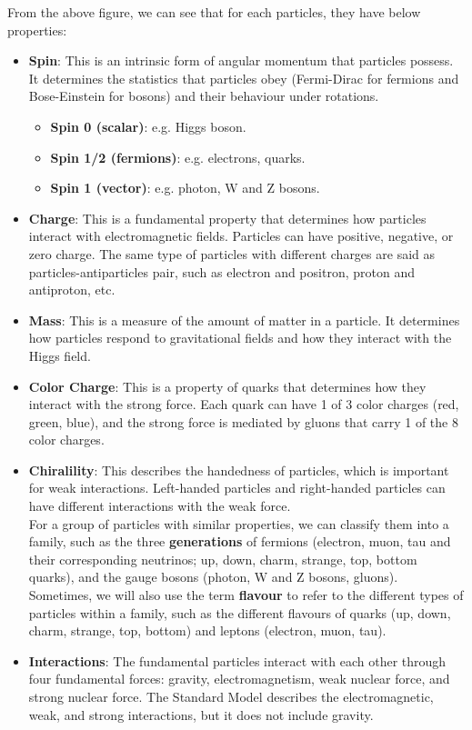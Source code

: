 \begin{foundation}
    From the above figure, we can see that for each particles, they have below properties:
    \begin{itemize}
        \item \textbf{Spin}: This is an intrinsic form of angular momentum that particles possess. It determines the statistics that particles obey (Fermi-Dirac for fermions and Bose-Einstein for bosons) and their behaviour under rotations.
        \begin{itemize}
        \item \textbf{Spin 0 (scalar)}: e.g. Higgs boson.
        \item \textbf{Spin 1/2 (fermions)}: e.g. electrons, quarks.
        \item \textbf{Spin 1 (vector)}: e.g. photon, W and Z bosons.
        \end{itemize}
            
        \item \textbf{Charge}: This is a fundamental property that determines how particles interact with electromagnetic fields. Particles can have positive, negative, or zero charge. The same type of particles with different charges are said as particles-antiparticles pair, such as electron and positron, proton and antiproton, etc.
        \item \textbf{Mass}: This is a measure of the amount of matter in a particle. It determines how particles respond to gravitational fields and how they interact with the Higgs field.
        \item \textbf{Color Charge}: This is a property of quarks that determines how they interact with the strong force. Each quark can have 1 of 3 color charges (red, green, blue), and the strong force is mediated by gluons that carry 1 of the 8 color charges.
        \item \textbf{Chiralility}: This describes the handedness of particles, which is important for weak interactions. Left-handed particles and right-handed particles can have different interactions with the weak force. \\

        For a group of particles with similar properties, we can classify them into a family, such as the three \textbf{generations} of fermions (electron, muon, tau and their corresponding neutrinos; up, down, charm, strange, top, bottom quarks), and the gauge bosons (photon, W and Z bosons, gluons). \\Sometimes, we will also use the term \textbf{flavour} to refer to the different types of particles within a family, such as the different flavours of quarks (up, down, charm, strange, top, bottom) and leptons (electron, muon, tau).

        \item \textbf{Interactions}: The fundamental particles interact with each other through four fundamental forces: gravity, electromagnetism, weak nuclear force, and strong nuclear force. The Standard Model describes the electromagnetic, weak, and strong interactions, but it does not include gravity.
    \end{itemize}
\end{foundation}

